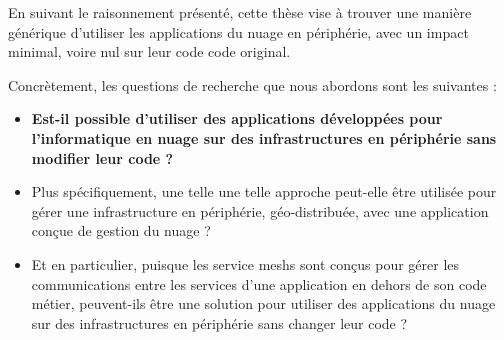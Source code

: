 En suivant le raisonnement présenté, cette thèse vise à trouver une
manière générique d'utiliser les applications du nuage en périphérie,
avec un impact minimal, voire nul sur leur code code original.

Concrètement, les questions de recherche que nous abordons sont les suivantes :
\begin{itemize}
\item \textbf{Est-il possible d'utiliser des applications
    développées pour l'informatique en nuage sur des infrastructures
    en périphérie sans modifier leur code ?}

\item Plus spécifiquement, une telle une telle approche peut-elle être
  utilisée pour gérer une infrastructure en périphérie,
  géo-distribuée, avec une application conçue de gestion du nuage ?

\item Et en particulier, puisque les service meshs sont conçus pour
  gérer les communications entre les services d'une application en
  dehors de son code métier, peuvent-ils être une solution pour
  utiliser des applications du nuage sur des infrastructures en
  périphérie sans changer leur code ?
\end{itemize}











